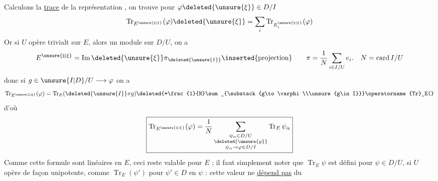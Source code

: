 Calculons la \uline{trace} de la représentation , on trouve pour $\varphi\deleted{\unsure{\xi}}\in D/I$
\[
\operatorname{Tr}_{E^{\unsure{\natural|\xi}}}(\varphi)\deleted{\unsure{\xi}}=\sum_i\operatorname{Tr}_{E_i^{\unsure{\natural|\xi}}}(\varphi)
\]
Or si  $U$ opère trivialt sur $E$,  alors un module sur $D/U$, on a
\[
E^{\unsure{\natural|\xi}}=\operatorname{Im}\deleted{\unsure{\xi}}\pi_{\deleted{\unsure{I}}}\inserted{\text{projection}}\qquad
\pi=\frac{1}{N}\sum_{i\in I/U}e_i.\quad N=\operatorname{card} I/U
\]
donc si $g\in\unsure{I|D}/U\longrightarrow\varphi$ on a
\[
\operatorname{Tr}_{E^{\unsure{\natural|\xi}}}(\varphi)=\operatorname{Tr}_E(\deleted{\unsure{I}}\pi g)\deleted{=\frac{1}{N}\sum_{\substack{g\to\varphi\\\unsure{g\in I}}}\operatorname{Tr}_E(}
\]
d'où
\[
\boxed{\operatorname{Tr}_{E^{\unsure{\natural|\xi}}}(\varphi)=\frac{1}{N}\sum_{\substack{\psi_\alpha\in D/U\\\deleted{\unsure{g}}\\\psi_\alpha\to\varphi\in D/I}}\operatorname{Tr}_E\psi_\alpha}
\]
Comme  cette formule sont linéaires en $E$, ceci reste valable pour  $E$ ; il faut simplement noter que $\operatorname{Tr}_E\psi$ est défini  pour $\psi\in D/U$, si $U$ opère de façon unipotente, comme $\operatorname{Tr}_E(\psi')$ pour $\psi'\in D$  en $\psi$ : cette valeur ne \uline{dépend pas} du


